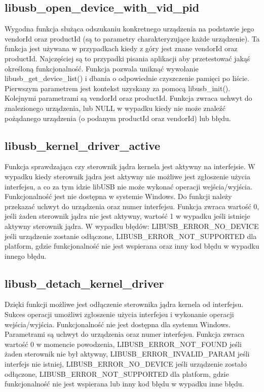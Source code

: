 \documentclass{BscUS}
\begin{document}
\subsection{libusb\_open\_device\_with\_vid\_pid}
Wygodna funkcja służąca odszukaniu konkretnego urządzenia na podstawie jego vendorId oraz productId (są to parametry charakteryzujące każde urządzenie).
\newline
Ta funkcja jest używana w przypadkach kiedy z góry jest znane vendorId oraz productId. Najczęściej są to przypadki pisania aplikacji aby przetestować jakąś określoną funkcjonalność. Funkcja pozwala uniknąć wywołanie libusb\_get\_device\_list() i dbania o odpowiednie czyszczenie pamięci po liście.
\newline
Pierwszym parametrem jest kontekst uzyskany za pomocą libusb\_init().
\newline
Kolejnymi parametrami są vendorId oraz productId.
\newline
Funkcja zwraca uchwyt do znalezionego urządzenia, lub NULL w wypadku kiedy nie może znaleźć pożądanego urządzenia (o podanym productId oraz vendorId) lub błędu.
\subsection{libusb\_kernel\_driver\_active}
Funkcja sprawdzająca czy sterownik jądra kernela jest aktywny na interfejsie.
\newline
W wypadku kiedy sterownik jądra jest aktywny nie możliwe jest zgłoszenie użycia interfejsu, a co za tym idzie libUSB nie może wykonać operacji wejścia/wyjścia.
\newline
Funkcjonalność jest nie dostępna w systemie Windows.
\newline
Do funkcji należy przekazać uchwyt do urządzenia oraz numer interfejsu.
\newline
Funkcja zwraca wartość 0, jeśli żaden sterownik jądra nie jest aktywny, wartość 1 w wypadku jeśli istnieje aktywny sterownik jądra.
\newline
W wypadku błędów: LIBUSB\_ERROR\_NO\_DEVICE jeśli urządzenie zostanie odłączone, LIBUSB\_ERROR\_NOT\_SUPPORTED dla platform, gdzie funkcjonalność nie jest wspierana oraz inny kod błędu w wypadku innego błędu.
\subsection{libusb\_detach\_kernel\_driver}
Dzięki funkcji możliwe jest odłączenie sterownika jądra kernela od interfejsu.
\newline
Sukces operacji umożliwi zgłoszenie użycia interfejsu i wykonanie operacji wejścia/wyjścia.
\newline
Funkcjonalność nie jest dostępna dla systemu Windows.
\newline
Parametrami są uchwyt do urządzenia oraz numer interfejsu.
\newline
Funkcja zwraca wartość 0 w momencie powodzenia, LIBUSB\_ERROR\_NOT\_FOUND jeśli żaden sterownik nie był aktywny, LIBUSB\_ERROR\_INVALID\_PARAM jeśli interfejs nie istniej, LIBUSB\_ERROR\_NO\_DEVICE jeśli urządzenie zostało odłączone, LIBUSB\_ERROR\_NOT\_SUPPORTED dla platform, gdzie funkcjonalność nie jest wspierana lub inny kod błędu w wypadku inne błędu.
\end{document}
